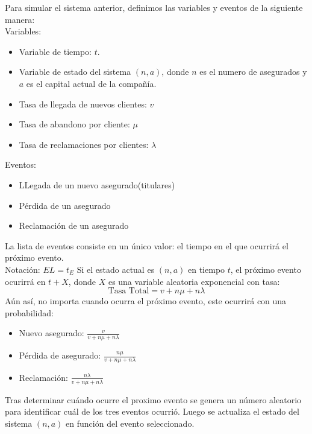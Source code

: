\documentclass[12pt, a4paper]{article}
\begin{document}
Para simular el sistema anterior, definimos las variables y eventos de la siguiente manera:
\\
Variables: 
\begin{itemize}
    \item Variable de tiempo: $t$.
    \item Variable de estado del sistema $(n,a)$, donde $n$ es el numero de asegurados y $a$ es el capital actual de la compañía.
    \item Tasa de llegada de nuevos clientes: $v$
    \item Tasa de abandono por cliente: $\mu$
    \item Tasa de reclamaciones por clientes: $\lambda$
\end{itemize}
Eventos:
\begin{itemize}
    \item LLegada de un nuevo asegurado(titulares)
    \item Pérdida de un asegurado
    \item Reclamación de un asegurado
\end{itemize}
La lista de eventos consiste en un único valor: el tiempo en el que ocurrirá el próximo evento.\\
Notación: $EL = t_E$
Si el estado actual es $(n,a)$ en tiempo $t$, el próximo evento ocurirrá en $t + X$, donde $X$ es una variable
aleatoria exponencial con tasa:
$$ \text{Tasa Total}= v + n\mu + n\lambda$$
Aún así, no importa cuando ocurra el próximo evento, este ocurrirá con una probabilidad:
\begin{itemize}
    \item Nuevo asegurado: $\frac{v}{v+n\mu+n\lambda}$
    \item Pérdida de asegurado: $\frac{n\mu}{v+n\mu+n\lambda}$
    \item Reclamación: $\frac{n\lambda}{v+n\mu+n\lambda}$
\end{itemize}
Tras determinar cuándo ocurre el proximo evento se genera un número aleatorio para identificar
cuál de los tres eventos ocurrió. Luego se actualiza el estado del sistema $(n,a)$ en función del evento seleccionado.
\end{document}
